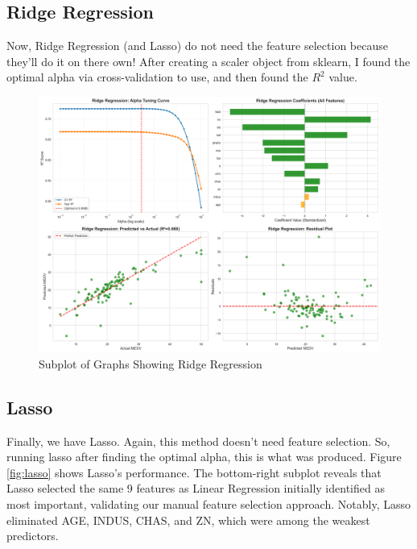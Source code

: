 \documentclass[12pt]{article}
\begin{document}
\subsection{Ridge Regression}

Now, Ridge Regression (and Lasso) do not need the feature selection because they'll do it on there own! 
After creating a scaler object from sklearn, I found the optimal alpha via cross-validation to use, and then found the $R^2$ value.

\begin{figure}[H]
    \centering
    \includegraphics[width=0.85\linewidth]{images/03_ridge_regression.png}
    \caption{Subplot of Graphs Showing Ridge Regression}
    \label{fig:ridgeregression}
\end{figure}

\subsection{Lasso}

Finally, we have Lasso. Again, this method doesn't need feature selection. So, running lasso after finding the optimal alpha, this is what was produced.
Figure \ref{fig:lasso} shows Lasso's performance. The bottom-right subplot reveals that Lasso selected the same 9 features as Linear Regression initially identified as most important, validating our manual feature selection approach. Notably, Lasso eliminated AGE, INDUS, CHAS, and ZN, which were among the weakest predictors.
\end{document}
